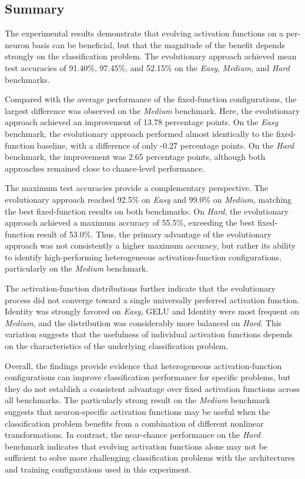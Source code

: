 \documentclass[12pt,fleqn,a4paper]{article}
\begin{document}
\subsection{Summary}

The experimental results demonstrate that evolving activation functions on a per-neuron basis can be beneficial, but that the magnitude of the benefit depends strongly on the classification problem. The evolutionary approach achieved mean test accuracies of 91.40\%, 97.45\%, and 52.15\% on the \textit{Easy}, \textit{Medium}, and \textit{Hard} benchmarks.

Compared with the average performance of the fixed-function configurations, the largest difference was observed on the \textit{Medium} benchmark. Here, the evolutionary approach achieved an improvement of 13.78 percentage points. On the \textit{Easy} benchmark, the evolutionary approach performed almost identically to the fixed-function baseline, with a difference of only -0.27 percentage points. On the \textit{Hard} benchmark, the improvement was 2.65 percentage points, although both approaches remained close to chance-level performance.

The maximum test accuracies provide a complementary perspective. The evolutionary approach reached 92.5\% on \textit{Easy} and 99.0\% on \textit{Medium}, matching the best fixed-function results on both benchmarks. On \textit{Hard}, the evolutionary approach achieved a maximum accuracy of 55.5\%, exceeding the best fixed-function result of 53.0\%. Thus, the primary advantage of the evolutionary approach was not consistently a higher maximum accuracy, but rather its ability to identify high-performing heterogeneous activation-function configurations, particularly on the \textit{Medium} benchmark.

The activation-function distributions further indicate that the evolutionary process did not converge toward a single universally preferred activation function. Identity was strongly favored on \textit{Easy}, GELU and Identity were most frequent on \textit{Medium}, and the distribution was considerably more balanced on \textit{Hard}. This variation suggests that the usefulness of individual activation functions depends on the characteristics of the underlying classification problem.

Overall, the findings provide evidence that heterogeneous activation-function configurations can improve classification performance for specific problems, but they do not establish a consistent advantage over fixed activation functions across all benchmarks. The particularly strong result on the \textit{Medium} benchmark suggests that neuron-specific activation functions may be useful when the classification problem benefits from a combination of different nonlinear transformations. In contrast, the near-chance performance on the \textit{Hard} benchmark indicates that evolving activation functions alone may not be sufficient to solve more challenging classification problems with the architectures and training configurations used in this experiment.
\end{document}
